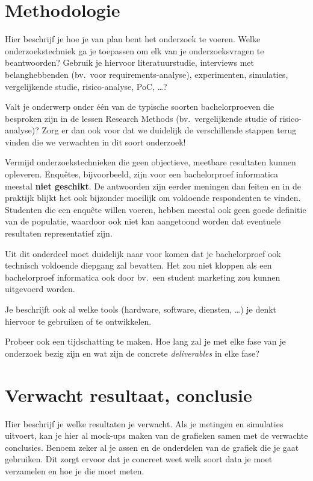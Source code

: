 \section{Methodologie}%
\label{sec:methodologie}

Hier beschrijf je hoe je van plan bent het onderzoek te voeren. Welke onderzoekstechniek ga je toepassen om elk van je onderzoeksvragen te beantwoorden? Gebruik je hiervoor literatuurstudie, interviews met belanghebbenden (bv.~voor requirements-\-analyse), experimenten, simulaties, vergelijkende studie, risico-\-analyse, PoC, \ldots?

Valt je onderwerp onder één van de typische soorten bachelorproeven die besproken zijn in de lessen Research Methods (bv.\ vergelijkende studie of risico-\-analyse)? Zorg er dan ook voor dat we duidelijk de verschillende stappen terug vinden die we verwachten in dit soort onderzoek!

Vermijd onderzoekstechnieken die geen objectieve, meetbare resultaten kunnen opleveren. Enquêtes, bijvoorbeeld, zijn voor een bachelorproef informatica meestal \textbf{niet geschikt}. De antwoorden zijn eerder meningen dan feiten en in de praktijk blijkt het ook bijzonder moeilijk om voldoende respondenten te vinden. Studenten die een enquête willen voeren, hebben meestal ook geen goede definitie van de populatie, waardoor ook niet kan aangetoond worden dat eventuele resultaten representatief zijn.

Uit dit onderdeel moet duidelijk naar voor komen dat je bachelorproef ook technisch voldoende diepgang zal bevatten. Het zou niet kloppen als een bachelorproef informatica ook door bv.\ een student marketing zou kunnen uitgevoerd worden.

Je beschrijft ook al welke tools (hardware, software, diensten, \ldots) je denkt hiervoor te gebruiken of te ontwikkelen.

Probeer ook een tijdschatting te maken. Hoe lang zal je met elke fase van je onderzoek bezig zijn en wat zijn de concrete \emph{deliverables} in elke fase?

\section{Verwacht resultaat, conclusie}%
\label{sec:verwachte_resultaten}

Hier beschrijf je welke resultaten je verwacht. Als je metingen en simulaties uitvoert, kan je hier al mock-\-ups maken van de grafieken samen met de verwachte conclusies. Benoem zeker al je assen en de onderdelen van de grafiek die je gaat gebruiken. Dit zorgt ervoor dat je concreet weet welk soort data je moet verzamelen en hoe je die moet meten.

